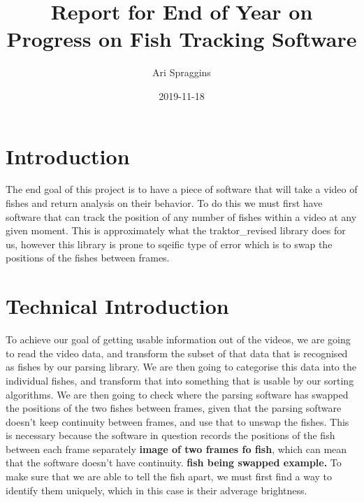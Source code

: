 \documentclass[12pt]{article}
\title{Report for End of Year on Progress on Fish Tracking Software}
\author{Ari Spraggins}
\date{2019-11-18}
\begin{document}
\maketitle
{}

\section{Introduction}

The end goal of this project is to have a piece of software that will take a video of fishes and return analysis on their behavior. To do this we must first have software that can track the position of any number of fishes within a video at any given moment. This is approximately what the traktor\_revised library does for us, however this library is prone to sqeific type of error which is to swap the positions of the fishes between frames.

\section{Technical Introduction}

To achieve our goal of getting usable information out of the videos, we are going to read the video data, and transform the subset of that data that is recognised as fishes by our parsing library. We are then going to categorise this data into the individual fishes, and transform that into something that is usable by our sorting algorithms. We are then going to check where the parsing software has swapped the positions of the two fishes between frames, given that the parsing software doesn't keep continuity between frames, and use that to unswap the fishes. This is necessary because the software in question records the positions of the fish between each frame separately \textbf{image of two frames fo fish}, which can mean that the software doesn't have continuity. \textbf{fish being swapped example.} To make sure that we are able to tell the fish apart, we must first find a way to identify them uniquely, which in this case is their adverage brightness.

\end{document}
